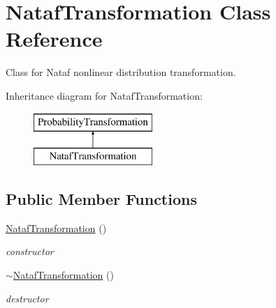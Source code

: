 \section{Nataf\+Transformation Class Reference}
\label{classPecos_1_1NatafTransformation}


Class for Nataf nonlinear distribution transformation.  


Inheritance diagram for Nataf\+Transformation\+:\begin{figure}[H]
\begin{center}
\leavevmode
\includegraphics[height=2.000000cm]{classPecos_1_1NatafTransformation}
\end{center}
\end{figure}
\subsection*{Public Member Functions}
\begin{DoxyCompactItemize}
\item 
\hyperlink{classPecos_1_1NatafTransformation_ad619eb82703cf3598c33964ce4f179d1}{Nataf\+Transformation} ()\label{classPecos_1_1NatafTransformation_ad619eb82703cf3598c33964ce4f179d1}

\begin{DoxyCompactList}\small\item\em constructor \end{DoxyCompactList}\item 
\hyperlink{classPecos_1_1NatafTransformation_af6d53b385a804858e3e0d9b4e419f5ef}{$\sim$\+Nataf\+Transformation} ()\label{classPecos_1_1NatafTransformation_af6d53b385a804858e3e0d9b4e419f5ef}

\begin{DoxyCompactList}\small\item\em destructor \end{DoxyCompactList}\end{DoxyCompactItemize}

